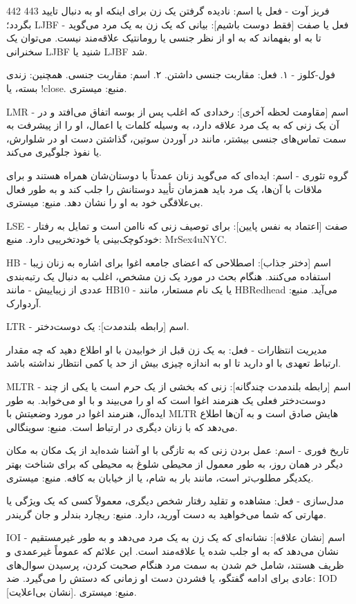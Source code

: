 442 443
فریز آوت - فعل یا اسم: نادیده گرفتن یک زن برای اینکه او به دنبال تایید بگردد؛ LJBF - فعل یا صفت [فقط دوست باشیم]: بیانی که یک زن به یک مرد می‌گوید تا به او بفهماند که به او از نظر جنسی یا رومانتیک علاقه‌مند نیست. می‌توان یک سخنرانی LJBF شنید یا LJBF شد.

فول-کلوز - ۱. فعل: مقاربت جنسی داشتن. ۲. اسم: مقاربت جنسی. همچنین: زندی بسته، یا !close. منبع: میستری.

LMR - اسم [مقاومت لحظه آخری]: رخدادی که اغلب پس از بوسه اتفاق می‌افتد و در آن یک زنی که به یک مرد علاقه دارد، به وسیله کلمات یا اعمال، او را از پیشرفت به سمت تماس‌های جنسی بیشتر، مانند در آوردن سوتین، گذاشتن دست او در شلوارش، یا نفوذ جلوگیری می‌کند.

گروه تئوری - اسم: ایده‌ای که می‌گوید زنان عمدتاً با دوستان‌شان همراه هستند و برای ملاقات با آن‌ها، یک مرد باید همزمان تأیید دوستانش را جلب کند و به طور فعال بی‌علاقگی خود به او را نشان دهد. منبع: میستری.

LSE - صفت [اعتماد به نفس پایین]: برای توصیف زنی که ناامن است و تمایل به رفتار خودکوچک‌بینی یا خودتخریبی دارد. منبع: MrSex4uNYC.

HB - اسم [دختر جذاب]: اصطلاحی که اعضای جامعه اغوا برای اشاره به زنان زیبا استفاده می‌کنند. هنگام بحث در مورد یک زن مشخص، اغلب به دنبال یک رتبه‌بندی عددی از زیباییش - مانند HB10 - یا یک نام مستعار، مانند HBRedhead می‌آید. منبع: آردوارک.

LTR - اسم [رابطه بلندمدت]: یک دوست‌دختر.

مدیریت انتظارات - فعل: به یک زن قبل از خوابیدن با او اطلاع دهید که چه مقدار ارتباط تعهدی با او دارید تا او به اندازه چیزی بیش از حد یا کمی انتظار نداشته باشد.

MLTR - اسم [رابطه بلندمدت چندگانه]: زنی که بخشی از یک حرم است یا یکی از چند دوست‌دختر فعلی یک هنرمند اغوا است که او را می‌بیند و با او می‌خوابد. به طور ایده‌آل، هنرمند اغوا در مورد وضعیتش با MLTR هایش صادق است و به آن‌ها اطلاع می‌دهد که با زنان دیگری در ارتباط است. منبع: سوینگالی.

تاریخ فوری - اسم: عمل بردن زنی که به تازگی با او آشنا شده‌اید از یک مکان به مکان دیگر در همان روز، به طور معمول از محیطی شلوغ به محیطی که برای شناخت بهتر یکدیگر مطلوب‌تر است، مانند بار به شام، یا از خیابان به کافه. منبع: میستری.

مدل‌سازی - فعل: مشاهده و تقلید رفتار شخص دیگری، معمولاً کسی که یک ویژگی یا مهارتی که شما می‌خواهید به دست آورید، دارد. منبع: ریچارد بندلر و جان گریندر.

IOI - اسم [نشان علاقه]: نشانه‌ای که یک زن به یک مرد می‌دهد و به طور غیرمستقیم نشان می‌دهد که به او جلب شده یا علاقه‌مند است. این علائم که عموماً غیرعمدی و ظریف هستند، شامل خم شدن به سمت مرد هنگام صحبت کردن، پرسیدن سوال‌های عادی برای ادامه گفتگو، یا فشردن دست او زمانی که دستش را می‌گیرد. ضد: IOD [نشان بی‌اعلایت]. منبع: میستری.

